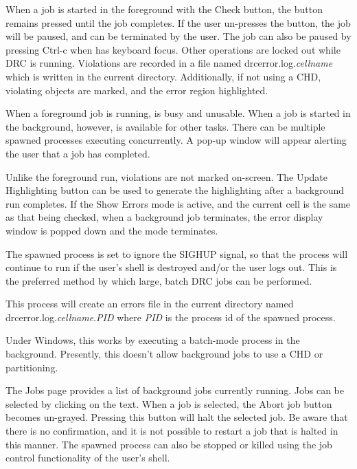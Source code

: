 When a job is started in the foreground with the {\cb Check} button,
the button remains pressed until the job completes.  If the user
un-presses the button, the job will be paused, and can be terminated
by the user.  The job can also be paused by pressing {\kb Ctrl-c} when
{\Xic} has keyboard focus.  Other operations are locked out while DRC
is running.  Violations are recorded in a file named {\vt
drcerror.log.}{\it cellname} which is written in the current
directory.  Additionally, if not using a CHD, violating objects are
marked, and the error region highlighted.

When a foreground job is running, {\Xic} is busy and unusable.  When a
job is started in the background, however, {\Xic} is available for
other tasks.  There can be multiple spawned processes executing
concurrently.  A pop-up window will appear alerting the user that a
job has completed.

Unlike the foreground run, violations are not marked on-screen.  The
{\cb Update Highlighting} button can be used to generate the
highlighting after a background run completes.  If the {\cb Show
Errors} mode is active, and the current cell is the same as that being
checked, when a background job terminates, the error display window is
popped down and the mode terminates.

The spawned process is set to ignore the {\vt SIGHUP} signal, so that
the process will continue to run if the user's shell is destroyed
and/or the user logs out.  This is the preferred method by which
large, batch DRC jobs can be performed.

This process will create an errors file in the current directory named
{\vt drcerror.log.}{\it cellname\/}{\vt .}{\it PID} where {\it PID} is
the process id of the spawned process.

Under Windows, this works by executing a batch-mode {\Xic} process in
the background.  Presently, this doesn't allow background jobs to use
a CHD or partitioning.

The {\cb Jobs} page provides a list of background jobs currently
running.  Jobs can be selected by clicking on the text.  When a job is
selected, the {\cb Abort job} button becomes un-grayed.  Pressing this
button will halt the selected job.  Be aware that there is no
confirmation, and it is not possible to restart a job that is halted
in this manner.  The spawned process can also be stopped or killed
using the job control functionality of the user's shell.



